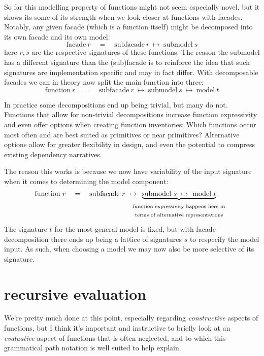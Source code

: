 \documentclass[twoside]{article}
\begin{document}
So far this modelling property of functions might not seem especially novel, but it shows its some of its strength
when we look closer at functions with facades. Notably, any given facade (which is a function itself) might be
decomposed into its own facade and its own model:
$$ \mbox{facade}\ r \quad = \quad \mbox{subfacade}\ r\ \mapsto\ \mbox{submodel}\ s $$
here $ r, s $ are the respective signatures of these functions. The reason the submodel has a different signature
than the (sub)facade is to reinforce the idea that such signatures are implementation specific and may in fact differ.
With decomposable facades we can in theory now split the main function into three:
$$ \mbox{function}\ r \quad = \quad
\mbox{subfacade}\ r\ \mapsto\ \mbox{submodel}\ s\ \mapsto\ \mbox{model}\ t $$

In practice some decompositions end up being trivial, but many do not. Functions that allow for non-trivial decompositions
increase function expressivity and even offer options when creating function inventories: Which functions occur most often
and are best suited as primitives or near primitives? Alternative options allow for greater flexibility in design,
and even the potential to compress existing dependency narratives.

The reason this works is because we now have variability of the input signature when it comes to determining the model
component:
$$ \mbox{function}\ r \quad = \quad
\mbox{subfacade}\ r\ \mapsto
\!\!\!\!\!\!\!\!\!\,\underbrace{\mbox{submodel}\ s\ \mapsto\ \mbox{model}\ t}_{
\begin{array}{c}
\mbox{\scriptsize function expressivity happens here in}	\\
\mbox{\scriptsize terms of alternative representations}
\end{array}} $$
The signature $ t $ for the most general model is fixed, but with facade decomposition there ends up being a lattice
of signatures $ s $ to respecify the model input. As such, when choosing a model we may now also be more selective
of its signature.

\section*{recursive evaluation}

We're pretty much done at this point, especially regarding \emph{constructive} aspects of functions, but I think
it's important and instructive to briefly look at an \emph{evaluative} aspect of functions that is often neglected,
and to which this grammatical path notation is well suited to help explain.
\end{document}
